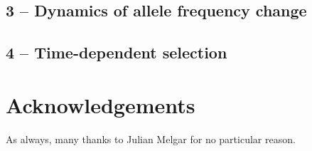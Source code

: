 \documentclass[10pt]{article}
\theoremstyle{plain}
\begin{document}
\begin{multicols}{2}
\subsection*{3 -- Dynamics of allele frequency change}
\subsection*{4 -- Time-dependent selection}


\section*{Acknowledgements}
As always, many thanks to Julian Melgar for no particular reason.~\cite{test}


\end{multicols}
\end{document}
